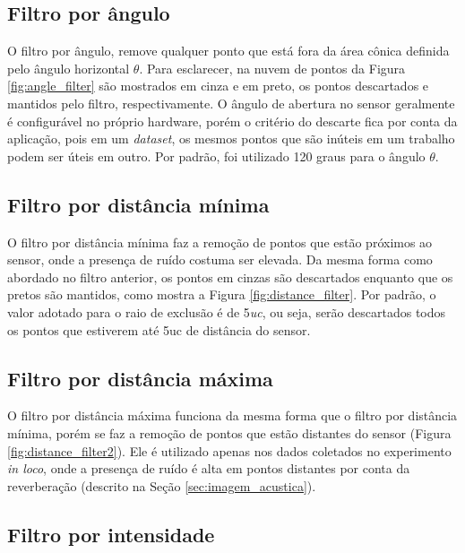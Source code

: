 \subsection{Filtro por ângulo}
\label{sec:angle_filter}

O filtro por ângulo, remove qualquer ponto que está fora da área cônica definida pelo ângulo horizontal $\theta$. Para esclarecer, na nuvem de pontos da Figura \ref{fig:angle_filter} são mostrados em cinza e em preto, os pontos descartados e mantidos pelo filtro, respectivamente.
O ângulo de abertura no sensor geralmente é configurável no próprio hardware, porém o critério do descarte fica por conta da aplicação, pois em um \textit{dataset}, os mesmos pontos que são inúteis em um trabalho podem ser úteis em outro. 
Por padrão, foi utilizado 120 graus para o ângulo $\theta$.

\subsection{Filtro por distância mínima}
\label{sec:distance_filter}

O filtro por distância mínima faz a remoção de pontos que estão próximos ao sensor, onde a presença de ruído costuma ser elevada. 
Da mesma forma como abordado no filtro anterior, os pontos em cinzas são descartados enquanto que os pretos são mantidos, como mostra a Figura \ref{fig:distance_filter}. 
Por padrão, o valor adotado para o raio de exclusão é de 5\textit{uc}, ou seja, serão descartados todos os pontos que estiverem até 5uc de distância do sensor.

\subsection{Filtro por distância máxima}
\label{sec:distance_filter2}

O filtro por distância máxima funciona da mesma forma que o filtro por distância mínima, porém se faz a remoção de pontos que estão distantes do sensor (Figura \ref{fig:distance_filter2}).
Ele é utilizado apenas nos dados coletados no experimento \textit{in loco}, onde a presença de ruído é alta em pontos distantes por conta da reverberação (descrito na Seção \ref{sec:imagem_acustica}).

\subsection{Filtro por intensidade}
\label{sec:intensity_filter}

